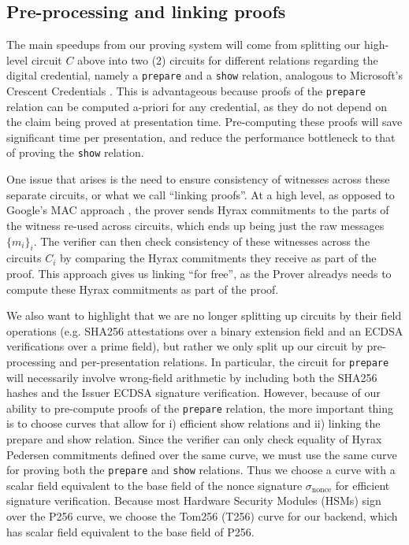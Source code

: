\subsection{Pre-processing and linking proofs}

The main speedups from our proving system will come from splitting our high-level circuit $C$ above into two (2) circuits for different relations regarding the digital credential, 
namely a \texttt{prepare} and a \texttt{show} relation, analogous to Microsoft's Crescent Credentials \cite{cryptoeprint:2024/2013}. 
This is advantageous because proofs of the \texttt{prepare} relation can be computed a-priori for any credential, as they do not depend on the claim being proved at presentation time. 
Pre-computing these proofs will save significant time per presentation, and reduce the performance bottleneck to that of proving the \texttt{show} relation.

One issue that arises is the need to ensure consistency of witnesses across these separate circuits, or what we call ``linking proofs''. 
At a high level, as opposed to Google's MAC approach \cite{cryptoeprint:2024/2010}, the prover sends Hyrax commitments to the parts of the witness re-used across circuits, 
which ends up being just the raw messages $\{m_i\}_i$. 
The verifier can then check consistency of these witnesses across the circuits $C_i$ by comparing the Hyrax commitments they receive as part of the proof. 
This approach gives us linking ``for free'', as the Prover alreadys needs to compute these Hyrax commitments as part of the proof.

We also want to highlight that we are no longer splitting up circuits by their field operations 
(e.g. SHA256 attestations over a binary extension field and an ECDSA verifications over a prime field), but rather we only split up our circuit by pre-processing and per-presentation relations. 
In particular, the circuit for \texttt{prepare} will necessarily involve wrong-field arithmetic by including both the SHA256 hashes and the Issuer ECDSA signature verification. 
However, because of our ability to pre-compute proofs of the \texttt{prepare} relation, the more important thing is to choose curves that allow for i) efficient show relations and ii) linking the prepare and show relation. 
Since the verifier can only check equality of Hyrax Pedersen commitments defined over the same curve, we must use the same curve for proving both the \texttt{prepare} and \texttt{show} relations.
Thus we choose a curve with a scalar field equivalent to the base field of the nonce signature $\sigma_{\text{nonce}}$ for efficient signature verification. 
Because most Hardware Security Modules (HSMs) sign over the P256 curve, we choose the Tom256 (T256) curve for our backend, which has scalar field equivalent to the base field of P256. 

